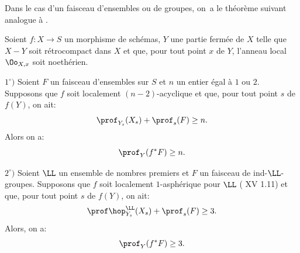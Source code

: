 Dans le cas d'un faisceau d'ensembles ou de groupes, on~a le th\'eor\`eme suivant analogue \`a .

\begin{theoreme} \label{XIV.1.18}
Soient $f:X\to S$ un morphisme de sch\'emas, $Y$ une partie ferm\'ee de $X$ telle que $X-Y$ soit r\'etrocompact dans $X$ et que, pour tout point $x$ de $Y$, l'anneau local $\Oo_{X, x}$ soit noeth\'erien.

$1^\circ)$ Soient $F$ un faisceau d'ensembles sur $S$ et $n$ un entier \'egal \`a $1$ ou $2$. Supposons que $f$ soit localement $(n-2)$-acyclique et que, pour tout point $s$ de $f(Y)$, on ait:
$$
\prof_{Y_s}(X_s)+\prof_s(F)\geq n.
$$
Alors on a:$$
\prof_Y(f^*F)\geq n.
$$

$2^\circ)$ Soient $\LL$ un ensemble de nombres premiers et $F$ un faisceau de ind-$\LL$-groupes. Supposons que $f$ soit localement $1$-asph\'erique pour $\LL$ (\textup{ XV 1.11}) et que, pour tout point $s$ de $f(Y)$, on ait:
$$
\prof\hop^\LL_{Y_s}(X_s)+\prof_s(F)\geq 3.
$$
Alors, on a:$$
\prof_Y(f^*F)\geq 3.
$$
\end{theoreme}


